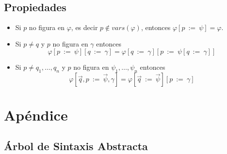 \documentclass[a4paper]{article}
\begin{document}
\subsection{Propiedades}
\begin{itemize}
    \item Si \(p\) no figura en \(\varphi\), es decir \(p \notin vars\left(\varphi\right)\), entonces
    \(\varphi \left[p \ := \ \psi\right] = \varphi\).
    \item Si \(p \neq q\) y \(p\) no figura en \(\gamma\) entonces
    \[
        \varphi\left[p \ := \ \psi\right]\left[q \ := \ \gamma\right] = \varphi\left[q \ := \ \gamma\right]\left[p \ := \ \psi\left[q \ := \ \gamma\right]\right]
    \]
    \item Si \(p \neq q_{1}, \dotsc, q_{n}\) y \(p\) no figura en \(\psi_{1}, \dotsc, \psi_{n}\) entonces
    \[
        \varphi\left[\vec{q}, p \ := \ \vec{\psi}, \gamma\right] = \varphi\left[\vec{q} \ := \ \vec{\psi}\right]\left[p \ := \ \gamma\right]
    \]
\end{itemize}
\section{Apéndice}
\subsection{Árbol de Sintaxis Abstracta}
\end{document}
